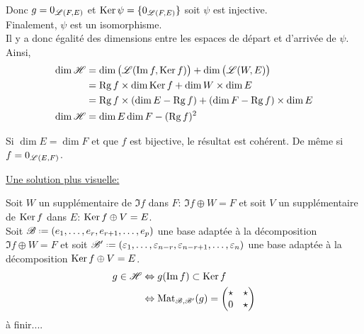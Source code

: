\begin{solution}
\begin{itemize}
\begin{itemize}
            Donc $g = 0_{\mathscr{L}(F, E)}$ et $\mathrm{Ker}\, \psi = \{ 0_{\mathscr{L}(F, E)} \}$ soit $\psi$ est injective. \\
            Finalement, $\psi$ est un isomorphisme. \\
            Il y a donc égalité des dimensions entre les espaces de départ et d'arrivée de $\psi$. Ainsi,
            \begin{align*}
                \dim \mathscr{H} &= \dim \big(\mathscr{L}(\Im f, \mathrm{Ker}\, f) \big) + \dim \big( \mathscr{L}(W, E) \big) \\
                &= \mathrm{Rg}\, f \times \dim \mathrm{Ker}\, f + \dim W \times \dim E \\
                &= \mathrm{Rg}\, f \times (\dim E - \mathrm{Rg}\, f) + (\dim F - \mathrm{Rg}\, f) \times \dim E \\
                \dim \mathscr{H} &= \dim E \dim F - (\mathrm{Rg}\, f)^2
            \end{align*}
        \end{itemize}
        \begin{remarque}
            Si $\dim E = \dim F$ et que $f$ est bijective, le résultat est cohérent. De même si $f = 0_{\mathscr{L}(E, F)}$.
        \end{remarque}
    \end{itemize}
\end{solution}

\underline{Une solution plus visuelle:}

\begin{solution}
    Soit $W$ un supplémentaire de $\Im f$ dans $F$: $\Im f \oplus W = F$ et soit $V$ un supplémentaire de $\mathrm{Ker}\, f$ dans $E$: $\mathrm{Ker}\, f \oplus V = E$. \\
    Soit $\mathscr{B} \defeq (e_1, \dots, e_r, e_{r+1}, \dots, e_p)$ une base adaptée à la décomposition $\Im f \oplus W = F$ et soit $\mathscr{B}' \defeq (\varepsilon_1, \dots, \varepsilon_{n-r}, \varepsilon_{n-r+1}, \dots, \varepsilon_n)$ une base adaptée à la décomposition $\mathrm{Ker}\, f \oplus V = E$.
    \begin{align*}
        g \in \mathscr{H} &\Leftrightarrow g(\Im f) \subset \mathrm{Ker}\, f \\
        &\Leftrightarrow \mathrm{Mat}_{\mathscr{B}, \mathscr{B}'}(g) = 
        \begin{pmatrix}
            \star & \star \\
            0 & \star
        \end{pmatrix}
    \end{align*}
    à finir....
\end{solution}

